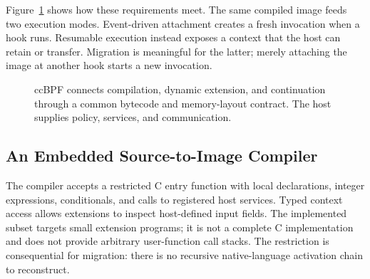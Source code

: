 \documentclass[conference,letterpaper]{IEEEtran}
\newcommand{\code}[1]{\texttt{#1}}
\begin{document}
Figure~\ref{fig:architecture} shows how these requirements meet. The same compiled image feeds two execution modes. Event-driven attachment creates a fresh invocation when a hook runs. Resumable execution instead exposes a context that the host can retain or transfer. Migration is meaningful for the latter; merely attaching the image at another hook starts a new invocation.

\begin{figure}[t]
\centering
{}
\caption{ccBPF connects compilation, dynamic extension, and continuation through a common bytecode and memory-layout contract. The host supplies policy, services, and communication.}
\label{fig:architecture}
\end{figure}

\subsection{An Embedded Source-to-Image Compiler}
The compiler accepts a restricted C entry function with local declarations, integer expressions, conditionals, and calls to registered host services. Typed context access allows extensions to inspect host-defined input fields. The implemented subset targets small extension programs; it is not a complete C implementation and does not provide arbitrary user-function call stacks. The restriction is consequential for migration: there is no recursive native-language activation chain to reconstruct.
\end{document}
